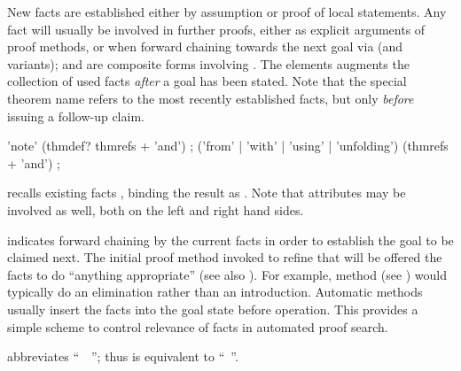 \begin{isabellebody}
\begin{isamarkuptext}
  New facts are established either by assumption or proof of local
  statements.  Any fact will usually be involved in further proofs,
  either as explicit arguments of proof methods, or when forward
  chaining towards the next goal via \mbox{} (and variants);
  \mbox{} and \mbox{} are composite forms
  involving \mbox{}.  The \mbox{} elements
  augments the collection of used facts \emph{after} a goal has been
  stated.  Note that the special theorem name \mbox{} refers
  to the most recently established facts, but only \emph{before}
  issuing a follow-up claim.

  \begin{rail}
    'note' (thmdef? thmrefs + 'and')
    ;
    ('from' | 'with' | 'using' | 'unfolding') (thmrefs + 'and')
    ;
  \end{rail}

  \begin{descr}

  \item [\mbox{\isa{\isacommand{note}}}~\isa{{\isachardoublequote}a\ {\isacharequal}\ b\isactrlsub {\isadigit{1}}\ {\isasymdots}\ b\isactrlsub n{\isachardoublequote}}]
  recalls existing facts , binding
  the result as .  Note that attributes may be involved as
  well, both on the left and right hand sides.

  \item [\mbox{\isa{\isacommand{then}}}] indicates forward chaining by the current
  facts in order to establish the goal to be claimed next.  The
  initial proof method invoked to refine that will be offered the
  facts to do ``anything appropriate'' (see also
  ).  For example, method \mbox{}
  (see ) would typically do an elimination
  rather than an introduction.  Automatic methods usually insert the
  facts into the goal state before operation.  This provides a simple
  scheme to control relevance of facts in automated proof search.
  
  \item [\mbox{\isa{\isacommand{from}}}~\isa{b}] abbreviates ``\mbox{}~~\mbox{}''; thus \mbox{} is
  equivalent to ``\mbox{}~''.
  

\end{descr}
\end{isamarkuptext}
\end{isabellebody}
